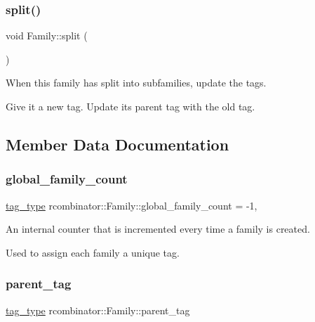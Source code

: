 \subsubsection{\texorpdfstring{split()}{split()}}
{\footnotesize\ttfamily void Family\+::split (\begin{DoxyParamCaption}{ }\end{DoxyParamCaption})}



When this family has split into subfamilies, update the tags. 

Give it a new tag. Update its parent tag with the old tag. 

\subsection{Member Data Documentation}
\mbox{\label{classrcombinator_1_1Family_a51709ff16837031e6b1123e64c614cc4}} 
\subsubsection{\texorpdfstring{global\+\_\+family\+\_\+count}{global\_family\_count}}
{\footnotesize\ttfamily \mbox{\hyperlink{constants_8h_a3e6daf1646e952257330d8cfe20e96f8}{tag\+\_\+type}} rcombinator\+::\+Family\+::global\+\_\+family\+\_\+count = -\/1\hspace{0.3cm}{\ttfamily [static]}, {\ttfamily [private]}}



An internal counter that is incremented every time a family is created. 

Used to assign each family a unique tag. \mbox{\label{classrcombinator_1_1Family_adfb3bf4271451de8917ea1ababd43b07}} 
\subsubsection{\texorpdfstring{parent\+\_\+tag}{parent\_tag}}
{\footnotesize\ttfamily \mbox{\hyperlink{constants_8h_a3e6daf1646e952257330d8cfe20e96f8}{tag\+\_\+type}} rcombinator\+::\+Family\+::parent\+\_\+tag\hspace{0.3cm}{\ttfamily [private]}}



